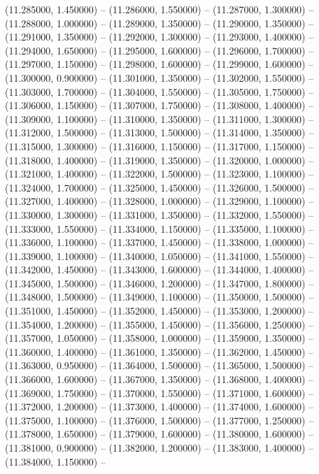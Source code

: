 (11.285000, 1.450000) -- 
(11.286000, 1.550000) -- 
(11.287000, 1.300000) -- 
(11.288000, 1.000000) -- 
(11.289000, 1.350000) -- 
(11.290000, 1.350000) -- 
(11.291000, 1.350000) -- 
(11.292000, 1.300000) -- 
(11.293000, 1.400000) -- 
(11.294000, 1.650000) -- 
(11.295000, 1.600000) -- 
(11.296000, 1.700000) -- 
(11.297000, 1.150000) -- 
(11.298000, 1.600000) -- 
(11.299000, 1.600000) -- 
(11.300000, 0.900000) -- 
(11.301000, 1.350000) -- 
(11.302000, 1.550000) -- 
(11.303000, 1.700000) -- 
(11.304000, 1.550000) -- 
(11.305000, 1.750000) -- 
(11.306000, 1.150000) -- 
(11.307000, 1.750000) -- 
(11.308000, 1.400000) -- 
(11.309000, 1.100000) -- 
(11.310000, 1.350000) -- 
(11.311000, 1.300000) -- 
(11.312000, 1.500000) -- 
(11.313000, 1.500000) -- 
(11.314000, 1.350000) -- 
(11.315000, 1.300000) -- 
(11.316000, 1.150000) -- 
(11.317000, 1.150000) -- 
(11.318000, 1.400000) -- 
(11.319000, 1.350000) -- 
(11.320000, 1.000000) -- 
(11.321000, 1.400000) -- 
(11.322000, 1.500000) -- 
(11.323000, 1.100000) -- 
(11.324000, 1.700000) -- 
(11.325000, 1.450000) -- 
(11.326000, 1.500000) -- 
(11.327000, 1.400000) -- 
(11.328000, 1.000000) -- 
(11.329000, 1.100000) -- 
(11.330000, 1.300000) -- 
(11.331000, 1.350000) -- 
(11.332000, 1.550000) -- 
(11.333000, 1.550000) -- 
(11.334000, 1.150000) -- 
(11.335000, 1.100000) -- 
(11.336000, 1.100000) -- 
(11.337000, 1.450000) -- 
(11.338000, 1.000000) -- 
(11.339000, 1.100000) -- 
(11.340000, 1.050000) -- 
(11.341000, 1.550000) -- 
(11.342000, 1.450000) -- 
(11.343000, 1.600000) -- 
(11.344000, 1.400000) -- 
(11.345000, 1.500000) -- 
(11.346000, 1.200000) -- 
(11.347000, 1.800000) -- 
(11.348000, 1.500000) -- 
(11.349000, 1.100000) -- 
(11.350000, 1.500000) -- 
(11.351000, 1.450000) -- 
(11.352000, 1.450000) -- 
(11.353000, 1.200000) -- 
(11.354000, 1.200000) -- 
(11.355000, 1.450000) -- 
(11.356000, 1.250000) -- 
(11.357000, 1.050000) -- 
(11.358000, 1.000000) -- 
(11.359000, 1.350000) -- 
(11.360000, 1.400000) -- 
(11.361000, 1.350000) -- 
(11.362000, 1.450000) -- 
(11.363000, 0.950000) -- 
(11.364000, 1.500000) -- 
(11.365000, 1.500000) -- 
(11.366000, 1.600000) -- 
(11.367000, 1.350000) -- 
(11.368000, 1.400000) -- 
(11.369000, 1.750000) -- 
(11.370000, 1.550000) -- 
(11.371000, 1.600000) -- 
(11.372000, 1.200000) -- 
(11.373000, 1.400000) -- 
(11.374000, 1.600000) -- 
(11.375000, 1.100000) -- 
(11.376000, 1.500000) -- 
(11.377000, 1.250000) -- 
(11.378000, 1.650000) -- 
(11.379000, 1.600000) -- 
(11.380000, 1.600000) -- 
(11.381000, 0.900000) -- 
(11.382000, 1.200000) -- 
(11.383000, 1.400000) -- 
(11.384000, 1.150000) -- 
